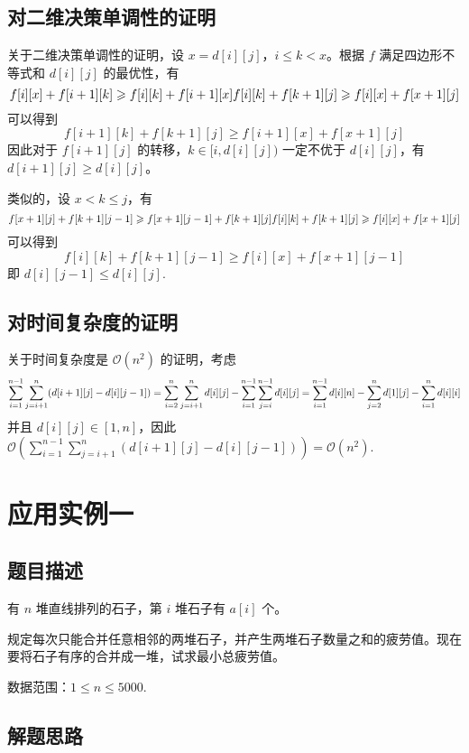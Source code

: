 \subsection{对二维决策单调性的证明}

关于二维决策单调性的证明，设 \(x=d[i][j]\)，\(i\le k < x\)。根据 \(f\)
满足四边形不等式和 \(d[i][j]\) 的最优性，有 \[
f[i][x]+f[i+1][k]\ge f[i][k]+f[i+1][x]\\
f[i][k]+f[k+1][j]\ge f[i][x]+f[x+1][j]
\] 可以得到 \[
f[i+1][k]+f[k+1][j]\ge f[i+1][x]+f[x+1][j]
\] 因此对于 \(f[i+1][j]\) 的转移，\(k\in [i,d[i][j])\) 一定不优于
\(d[i][j]\)，有 \(d[i+1][j]\ge d[i][j]\)。

类似的，设 \(x < k\le j\)，有 \[
f[x+1][j]+f[k+1][j-1]\ge f[x+1][j-1]+f[k+1][j]\\
f[i][k]+f[k+1][j]\ge f[i][x]+f[x+1][j]
\] 可以得到 \[
f[i][k]+f[k+1][j-1]\ge f[i][x]+f[x+1][j-1]
\] 即 \(d[i][j-1]\le d[i][j]\).

\subsection{对时间复杂度的证明}

关于时间复杂度是 \(\mathcal{O}(n^2)\) 的证明，考虑 \[
\sum_{i=1}^{n-1}\sum_{j=i+1}^n(d[i+1][j]-d[i][j-1])\\
=\sum_{i=2}^n\sum_{j=i+1}^nd[i][j]-\sum_{i=1}^{n-1}\sum_{j=i}^{n-1}d[i][j]\\
=\sum_{i=1}^{n-1}d[i][n]-\sum_{j=2}^nd[1][j]-\sum_{i=1}^nd[i][i]
\] 并且 \(d[i][j]\in[1,n]\)，因此
\(\mathcal{O}(\sum_{i=1}^{n-1}\sum_{j=i+1}^n(d[i+1][j]-d[i][j-1]))=\mathcal{O}(n^2)\).

\section{应用实例一}

\subsection{题目描述}

有 \(n\) 堆直线排列的石子，第 \(i\) 堆石子有 \(a[i]\) 个。

规定每次只能合并任意相邻的两堆石子，并产生两堆石子数量之和的疲劳值。现在要将石子有序的合并成一堆，试求最小总疲劳值。

数据范围：\(1\le n\le 5000\).

\subsection{解题思路}

